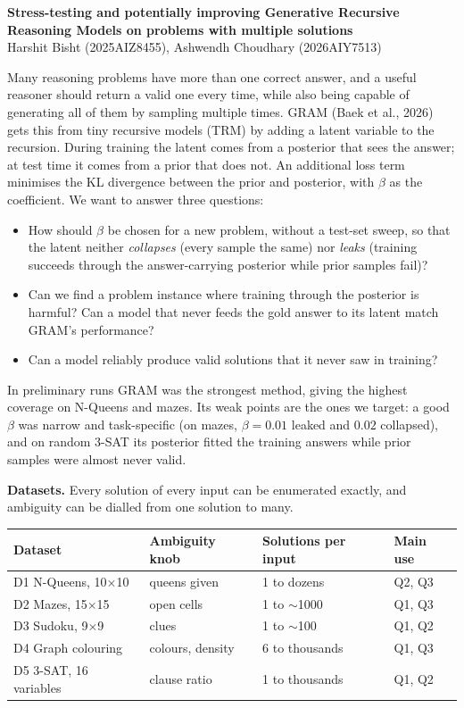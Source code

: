 \documentclass[10pt]{article}
\begin{document}
\begin{center}
{\large\bfseries Stress-testing and potentially improving Generative Recursive Reasoning Models on problems with multiple solutions}\\[2pt]
Harshit Bisht (2025AIZ8455), Ashwendh Choudhary (2026AIY7513)
\end{center}

Many reasoning problems have more than one correct answer, and a useful reasoner should return a valid one every time, while also being capable of generating all of them by sampling multiple times. GRAM (Baek et al., 2026) gets this from tiny recursive models (TRM) by adding a latent variable to the recursion. During training the latent comes from a posterior that sees the answer; at test time it comes from a prior that does not. An additional loss term minimises the KL divergence between the prior and posterior, with $\beta$ as the coefficient. We want to answer three questions:
\begin{itemize}
  \item[\textbf{Q1}] How should $\beta$ be chosen for a new problem, without a test-set sweep, so that the latent neither \emph{collapses} (every sample the same) nor \emph{leaks} (training succeeds through the answer-carrying posterior while prior samples fail)?
  \item[\textbf{Q2}] Can we find a problem instance where training through the posterior is harmful? Can a model that never feeds the gold answer to its latent match GRAM's performance?
  \item[\textbf{Q3}] Can a model reliably produce valid solutions that it never saw in training?
\end{itemize}

In preliminary runs GRAM was the strongest method, giving the highest coverage on N-Queens and mazes. Its weak points
are the ones we target: a good $\beta$ was narrow and task-specific (on mazes, $\beta=0.01$ leaked and $0.02$
collapsed), and on random 3-SAT its posterior fitted the training answers while prior samples were almost never valid.

\textbf{Datasets.} Every solution of every input can be enumerated exactly, and ambiguity can be dialled from one
solution to many.
\vspace{-3pt}
\begin{center}\small
\begin{tabular}{@{}llll@{}}
\toprule
Dataset & Ambiguity knob & Solutions per input & Main use \\
\midrule
D1 N-Queens, 10$\times$10 & queens given & 1 to dozens & Q2, Q3 \\
D2 Mazes, 15$\times$15 & open cells & 1 to $\sim$1000 & Q1, Q3 \\
D3 Sudoku, 9$\times$9 & clues & 1 to $\sim$100 & Q1, Q2 \\
D4 Graph colouring & colours, density & 6 to thousands & Q1, Q3 \\
D5 3-SAT, 16 variables & clause ratio & 1 to thousands & Q1, Q2 \\
\bottomrule
\end{tabular}
\end{center}
\vspace{-3pt}
\end{document}
